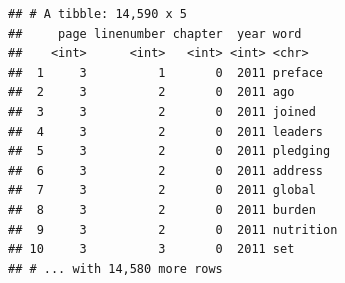 \documentclass[12pt,a4paper]{article}
\newenvironment{Shaded}{\begin{snugshade}}{\end{snugshade}}
\newcommand{\KeywordTok}[1]{\textcolor[rgb]{0.13,0.29,0.53}{\textbf{#1}}}
\newcommand{\DecValTok}[1]{\textcolor[rgb]{0.00,0.00,0.81}{#1}}
\newcommand{\StringTok}[1]{\textcolor[rgb]{0.31,0.60,0.02}{#1}}
\newcommand{\OperatorTok}[1]{\textcolor[rgb]{0.81,0.36,0.00}{\textbf{#1}}}
\newcommand{\NormalTok}[1]{#1}
\begin{document}
\begin{Shaded}
\end{Shaded}

\begin{verbatim}
## # A tibble: 14,590 x 5
##     page linenumber chapter  year word     
##    <int>      <int>   <int> <int> <chr>    
##  1     3          1       0  2011 preface  
##  2     3          2       0  2011 ago      
##  3     3          2       0  2011 joined   
##  4     3          2       0  2011 leaders  
##  5     3          2       0  2011 pledging 
##  6     3          2       0  2011 address  
##  7     3          2       0  2011 global   
##  8     3          2       0  2011 burden   
##  9     3          2       0  2011 nutrition
## 10     3          3       0  2011 set      
## # ... with 14,580 more rows
\end{verbatim}
\end{document}
